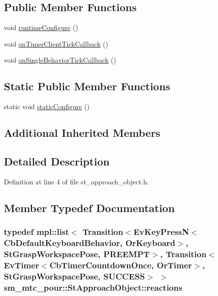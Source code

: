 \subsection*{Public Member Functions}
\begin{DoxyCompactItemize}
\item 
void \hyperlink{structsm__mtc__pour_1_1StApproachObject_a5689f55bcd8946e4b41f85b635bdc314}{runtime\+Configure} ()
\item 
void \hyperlink{structsm__mtc__pour_1_1StApproachObject_aab257ab99725475e366b3bc071fbc33b}{on\+Timer\+Client\+Tick\+Callback} ()
\item 
void \hyperlink{structsm__mtc__pour_1_1StApproachObject_a00693939af92e72a2e127ef58979ce48}{on\+Single\+Behavior\+Tick\+Callback} ()
\end{DoxyCompactItemize}
\subsection*{Static Public Member Functions}
\begin{DoxyCompactItemize}
\item 
static void \hyperlink{structsm__mtc__pour_1_1StApproachObject_ace1d9228e27166382806d7550315d508}{static\+Configure} ()
\end{DoxyCompactItemize}
\subsection*{Additional Inherited Members}


\subsection{Detailed Description}


Definition at line 4 of file st\+\_\+approach\+\_\+object.\+h.



\subsection{Member Typedef Documentation}
\subsubsection[{\texorpdfstring{reactions}{reactions}}]{\setlength{\rightskip}{0pt plus 5cm}typedef mpl\+::list$<$ Transition$<$Ev\+Key\+PressN$<$Cb\+Default\+Keyboard\+Behavior, {\bf Or\+Keyboard}$>$, {\bf St\+Grasp\+Workspace\+Pose}, {\bf P\+R\+E\+E\+M\+PT}$>$, Transition$<$Ev\+Timer$<$Cb\+Timer\+Countdown\+Once, {\bf Or\+Timer}$>$, {\bf St\+Grasp\+Workspace\+Pose}, {\bf S\+U\+C\+C\+E\+SS}$>$ $>$ {\bf sm\+\_\+mtc\+\_\+pour\+::\+St\+Approach\+Object\+::reactions}}\hypertarget{structsm__mtc__pour_1_1StApproachObject_a77af7fe8202535ce4430f32dc6a9a8e7}{}\label{structsm__mtc__pour_1_1StApproachObject_a77af7fe8202535ce4430f32dc6a9a8e7}


